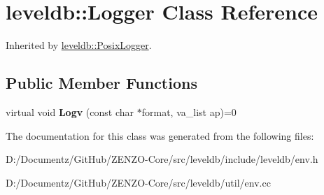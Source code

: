\hypertarget{classleveldb_1_1_logger}{}\section{leveldb\+::Logger Class Reference}
\label{classleveldb_1_1_logger}


Inherited by \mbox{\hyperlink{classleveldb_1_1_posix_logger}{leveldb\+::\+Posix\+Logger}}.

\subsection*{Public Member Functions}
\begin{DoxyCompactItemize}
\item 
\mbox{\label{classleveldb_1_1_logger_a408e238a0028a45e9cc7aec6ad2277c5}} 
virtual void {\bfseries Logv} (const char $\ast$format, va\+\_\+list ap)=0
\end{DoxyCompactItemize}


The documentation for this class was generated from the following files\+:\begin{DoxyCompactItemize}
\item 
D\+:/\+Documentz/\+Git\+Hub/\+Z\+E\+N\+Z\+O-\/\+Core/src/leveldb/include/leveldb/env.\+h\item 
D\+:/\+Documentz/\+Git\+Hub/\+Z\+E\+N\+Z\+O-\/\+Core/src/leveldb/util/env.\+cc\end{DoxyCompactItemize}
